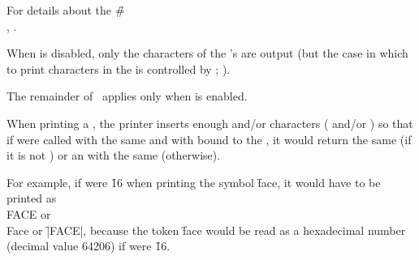For details about the \f{\#\\} , \seesection\SharpsignBackslash.

\endsubsubsection%

When  is disabled,
only the characters of the 's  are output 
(but the case in which to print characters in the  is
controlled by ;
\seesection\ReadtableCasePrintEffect).

The remainder of \thissection\ applies only 
when  is enabled.

When printing a , the printer inserts enough 
 and/or 
characters ( and/or ) so that if
 were called with the same  and
with  bound to the , it
would return the same  (if it is not 
) or an  
with the same  (otherwise).

For example, if  were \f{16} 
when printing the symbol \f{face}, it would have to be printed as
\f{\\FACE} or \f{\\Face} or \f{|FACE|}, 
because the token \f{face} would be read as a hexadecimal
number (decimal value 64206) if  were \f{16}.

